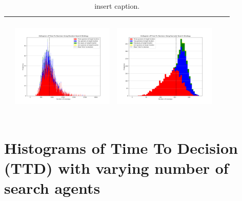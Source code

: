 \begin{landscape}
\begin{table}[h!]
\begin{tabular}{ | c | c | c | c | c |}
\begin{minipage}[c][49mm][c]{49mm}
    \end{minipage}
    &
    \begin{minipage}[c][49mm][c]{49mm}
      \includegraphics[width=49mm, height=49mm]{Chapters/MultiAgentTargetDetection/Figs/Histograms/MultipleTarget/3/3RandomHistogram.png}
    \end{minipage}
    &
    \begin{minipage}[c][49mm][c]{49mm}
      \includegraphics[width=49mm, height=49mm]{Chapters/MultiAgentTargetDetection/Figs/Histograms/MultipleTarget/3/3SaccadicHistogram.png}
    \end{minipage}
    \\
    \hline
   
  \end{tabular}
  \caption{insert caption. }\label{table:ORToolsResults}
\end{table}
\break




\vspace*{\fill}
\section{Histograms of Time To Decision (TTD) with varying number of search agents}


\end{landscape}
